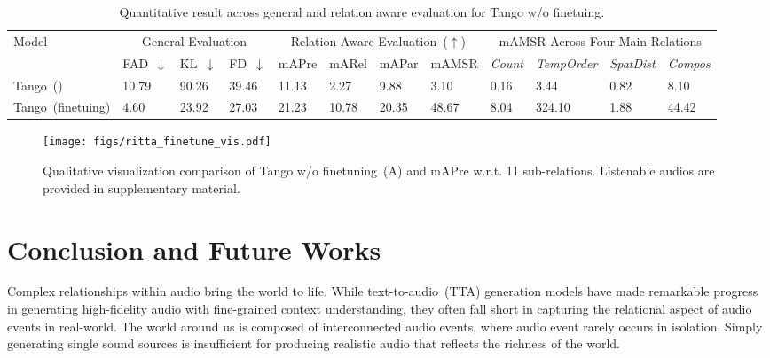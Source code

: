 \begin{table}[t]
\centering
\scriptsize
\caption{Quantitative result across general and relation aware evaluation for Tango w/o finetuing.}
\vspace{-2mm}
\begin{tabular}{l|p{0.5cm}<{\centering}p{0.5cm}<{\centering}p{0.5cm}<{\centering}|p{0.5cm}<{\centering}p{0.5cm}<{\centering}p{0.5cm}<{\centering}|p{0.7cm}<{\centering}|p{0.5cm}<{\centering}p{0.9cm}<{\centering}p{0.9cm}<{\centering}p{.7cm}<{\centering}}
\hline
\multirow{2}{*}{Model}  & \multicolumn{3}{c|}{General Evaluation}  & \multicolumn{4}{c|}{Relation Aware Evaluation~($\uparrow$)} &  \multicolumn{4}{c}{mAMSR Across Four Main Relations}\\
\cline{2-12}
 & FAD~$\downarrow$ &  KL~$\downarrow$ & FD~$\downarrow$ & mAPre& mARel & mAPar &mAMSR &  \emph{Count} & \emph{TempOrder} & \emph{SpatDist} & \emph{Compos} \\
\hline
Tango~(\citeyear{ghosal2023tango}) &  10.79 &  90.26 &  39.46 & 11.13 &  2.27 &  9.88 &  3.10 & 0.16 & 3.44 & 0.82 & 8.10\\
Tango~(finetuing) & \cellcolor{topcolor}4.60  &  \cellcolor{topcolor}23.92 & \cellcolor{topcolor}27.03 & \cellcolor{topcolor}21.23 & \cellcolor{topcolor}10.78 & \cellcolor{topcolor}20.35 & \cellcolor{topcolor}48.67 & \cellcolor{topcolor}8.04 & \cellcolor{topcolor}324.10 & \cellcolor{topcolor}1.88 & \cellcolor{topcolor}44.42 \\
\hline
\end{tabular}
\label{tab:finetune_result}
\end{table}

\begin{figure}[t]
    \centering
    \texttt{[image: figs/ritta\_finetune\_vis.pdf]}
    \caption{\small Qualitative visualization comparison of Tango w/o finetuning~(A) and mAPre w.r.t. 11 sub-relations. Listenable audios are provided in supplementary material.}
    \label{fig:tango_finetune_vis}
\end{figure}\section{Conclusion and Future Works}

Complex relationships within audio bring the world to life. While text-to-audio~(TTA) generation models have made remarkable progress in generating high-fidelity audio with fine-grained context understanding, they often fall short in capturing the relational aspect of audio events in real-world. The world around us is composed of interconnected audio events, where audio event rarely occurs in isolation. Simply generating single sound sources is insufficient for producing realistic audio that reflects the richness of the world.

